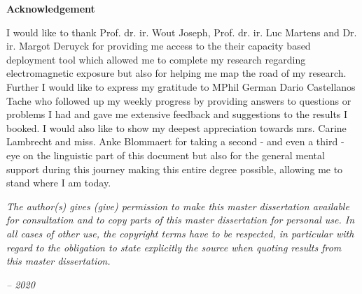 \thispagestyle{empty}    %

\begin{center}
\textbf{Acknowledgement}
\end{center}

I would like to thank Prof. dr. ir. Wout Joseph, Prof. dr. ir. Luc Martens and Dr. ir. Margot Deruyck
for providing me access to the their capacity based deployment tool which allowed me to 
complete my research regarding electromagnetic exposure but  also for helping me map the road of my research.
Further I would like to express my gratitude to MPhil German Dario Castellanos Tache
who followed up my weekly progress by providing answers to  questions or problems I had and 
gave me extensive feedback and suggestions to the results I booked.
I would also like to show my deepest appreciation towards mrs. Carine Lambrecht and 
miss. Anke Blommaert for taking a second - and even a third - eye on the linguistic part of this document but also for the general 
mental support during this journey making this entire degree possible, allowing me to stand where I am today. 

\vspace*{\fill}
\emph{
The author(s) gives (give) permission to make this master dissertation available for
consultation and to copy parts of this master dissertation for personal use.
In all cases of other use, the copyright terms have to be respected, in particular with regard to
the obligation to state explicitly the source when quoting results from this master dissertation.
}
\begin{flushright}
\emph{-- 2020}
\end{flushright}